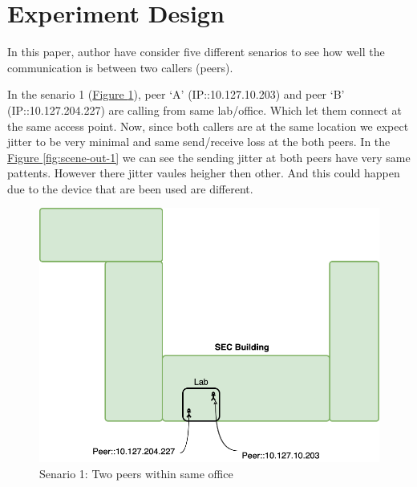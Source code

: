 \section{Experiment Design}	\label{sec:experiments}
	In this paper, author have consider five different senarios to see how well the communication is between two callers (peers). 
	
	In the senario 1 (\hyperref[fig:scene-1]{Figure \ref{fig:scene-1}}), peer `A' (IP::10.127.10.203) and peer `B' (IP::10.127.204.227) are calling from same lab/office. Which let them connect at the same access point. Now, since both callers are at the same location we expect jitter to be very minimal and same send/receive loss at the both peers. In the \hyperref[fig:scene-out-1]{Figure \ref{fig:scene-out-1}} we can see the sending jitter at both peers have very same pattents. However there jitter vaules heigher then other. And this could happen due to the device that are been used are different. 
	\begin{figure}[thb]
		\begin{minipage}{\textwidth}
			\includegraphics[scale=0.29]{Images/experiment/senarios/in_lab.drawio.png}
		\end{minipage}
		\caption{Senario 1: Two peers within same office}
		\label{fig:scene-1}
	\end{figure}

